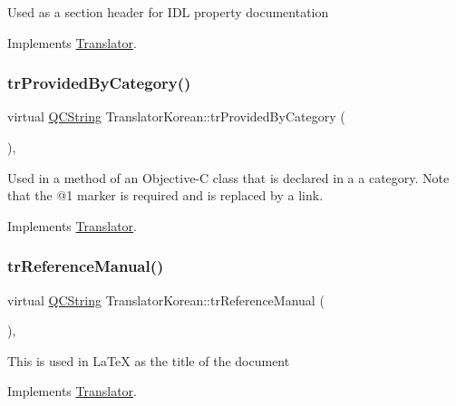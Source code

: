 Used as a section header for I\+DL property documentation 

Implements \mbox{\hyperlink{class_translator}{Translator}}.

\mbox{\label{class_translator_korean_af196b1d7279afbc65b8dda44ce762dc5}} 
\subsubsection{\texorpdfstring{trProvidedByCategory()}{trProvidedByCategory()}}
{\footnotesize\ttfamily virtual \mbox{\hyperlink{class_q_c_string}{Q\+C\+String}} Translator\+Korean\+::tr\+Provided\+By\+Category (\begin{DoxyParamCaption}{ }\end{DoxyParamCaption})\hspace{0.3cm}{\ttfamily [inline]}, {\ttfamily [virtual]}}

Used in a method of an Objective-\/C class that is declared in a a category. Note that the @1 marker is required and is replaced by a link. 

Implements \mbox{\hyperlink{class_translator}{Translator}}.

\mbox{\label{class_translator_korean_a601b6fdfd2679c06f23092c337f38cd1}} 
\subsubsection{\texorpdfstring{trReferenceManual()}{trReferenceManual()}}
{\footnotesize\ttfamily virtual \mbox{\hyperlink{class_q_c_string}{Q\+C\+String}} Translator\+Korean\+::tr\+Reference\+Manual (\begin{DoxyParamCaption}{ }\end{DoxyParamCaption})\hspace{0.3cm}{\ttfamily [inline]}, {\ttfamily [virtual]}}

This is used in La\+TeX as the title of the document 

Implements \mbox{\hyperlink{class_translator}{Translator}}.

\mbox{\label{class_translator_korean_a3364d5730272c08985751784a44eb24b}} 
